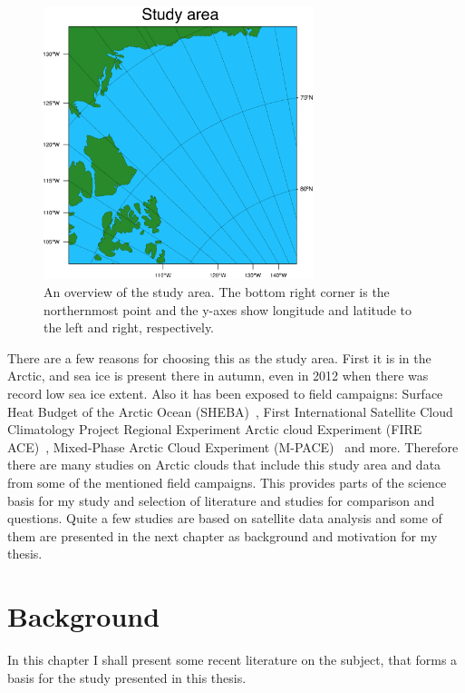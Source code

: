 \begin{figure}
\centering
\includegraphics[width=0.7\textwidth]{introduction/studyarea.png}
\caption{An overview of the study area. The bottom right corner is the northernmost point and the y-axes show longitude and latitude to the left and right, respectively.}
\label{fig:area}
\end{figure}
 
There are a few reasons for choosing this as the study area. First it is in the Arctic, and sea ice is present there in autumn, even in 2012 when there was record low sea ice extent. Also it has been exposed to field campaigns: Surface Heat Budget of the Arctic Ocean (SHEBA)~\citep{Uttal2002}, First International Satellite Cloud Climatology Project Regional Experiment Arctic cloud Experiment (FIRE ACE)~\citep{Curry2000}, Mixed-Phase Arctic Cloud Experiment (M-PACE)~\citep{Verlinde2007} and more. Therefore there are many studies on Arctic clouds that include this study area and data from some of the mentioned field campaigns. This provides parts of the science basis for my study and selection of literature and studies for comparison and questions. Quite a few studies are based on satellite data analysis and some of them are presented in the next chapter as background and motivation for my thesis.

\section{Background}%
\label{sec:background}
In this chapter I shall present some recent literature on the subject, that forms a basis for the study presented in this thesis.

